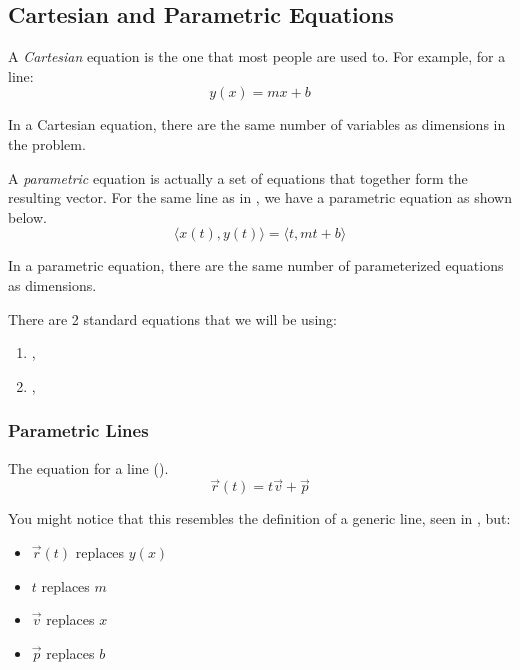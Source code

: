 \subsection{Cartesian and Parametric Equations}\label{subsec:Cartesian_Parametric}
\begin{definition}[Cartesian]\label{def:Cartesian}
  A \emph{Cartesian} equation is the one that most people are used to.
  For example, for a line:
  \begin{equation}\label{eq:Generic_Cartesian_Line}
    y(x) = mx + b
  \end{equation}

  In a Cartesian equation, there are the same number of variables as dimensions in the problem.
\end{definition}

\begin{definition}[Parametric]\label{def:Parametric}
  A \emph{parametric} equation is actually a set of equations that together form the resulting vector.
  For the same line as in , we have a parametric equation as shown below.
  \begin{equation}\label{eq:Generic_Parametric_Line}
    \langle x(t), y(t) \rangle = \langle t, mt + b \rangle
  \end{equation}

  In a parametric equation, there are the same number of parameterized equations as dimensions.
\end{definition}

There are 2 standard  equations that we will be using:
\begin{enumerate}[noitemsep]
\item {}, 
\item {}, 
\end{enumerate}

\subsubsection{Parametric Lines}\label{subsubsec:Parametric_Lines}
The  equation for a line ().
\begin{equation}\label{eq:Parametric_Line}
  \vec{r}(t) = t\vec{v} + \vec{p}
\end{equation}

You might notice that this resembles the definition of a generic  line, seen in , but:
\begin{itemize}[noitemsep]
\item $\vec{r}(t)$ replaces $y(x)$
\item $t$ replaces $m$
\item $\vec{v}$ replaces $x$
\item $\vec{p}$ replaces $b$
\end{itemize}


